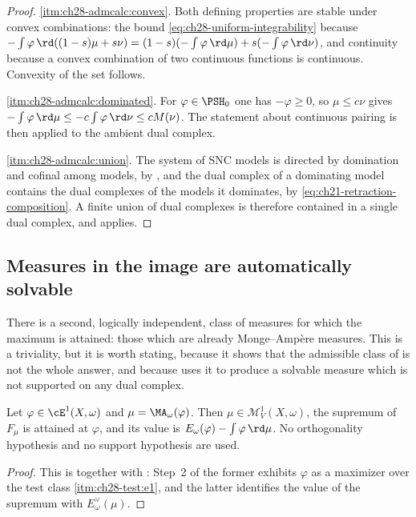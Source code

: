 \begin{proof}
\cref{itm:ch28-admcalc:convex}.  Both defining properties are stable under
convex combinations: the bound \eqref{eq:ch28-uniform-integrability} because
\(-\int\varphi\,\rd((1-s)\mu+s\nu)=(1-s)(-\int\varphi\,\rd\mu)
+s(-\int\varphi\,\rd\nu)\), and continuity because a convex combination of
two continuous functions is continuous.  Convexity of the set follows.

\cref{itm:ch28-admcalc:dominated}.  For \(\varphi\in\PSH_0\) one has
\(-\varphi\geq0\), so \(\mu\leq c\nu\) gives
\(-\int\varphi\,\rd\mu\leq-c\int\varphi\,\rd\nu\leq cM(\nu)\).  The
statement about continuous pairing is then
 applied to the ambient dual complex.

\cref{itm:ch28-admcalc:union}.  The system of SNC models is directed by
domination and cofinal among models, by , and the
dual complex of a dominating model contains the dual complexes of the models
it dominates, by \eqref{eq:ch21-retraction-composition}.  A finite union of
dual complexes is therefore contained in a single dual complex, and
 applies.
\end{proof}

\subsection{Measures in the image are automatically solvable}
\label{sec:ch28-image-solvable}

There is a second, logically independent, class of measures for which the
maximum is attained: those which are already Monge--Amp\`ere measures.  This
is a triviality, but it is worth stating, because it shows that the
admissible class of  is not the whole
answer, and because  uses it to produce
a solvable measure which is not supported on any dual complex.

\begin{proposition}
\label{prop:ch28-image-is-solvable}
Let \(\varphi\in\cE^1(X,\omega)\) and \(\mu=\MA_\omega(\varphi)\).  Then
\(\mu\in\mathcal M^1_V(X,\omega)\), the supremum of \(F_\mu\) is attained at
\(\varphi\), and its value is
\(E_\omega(\varphi)-\int\varphi\,\rd\mu\).  No orthogonality hypothesis and
no support hypothesis are used.
\end{proposition}

\begin{proof}
This is  together with
: Step~2 of the former exhibits
\(\varphi\) as a maximizer over the test class
\cref{itm:ch28-test:e1}, and the latter identifies the value of the supremum
with \(E^\vee_\omega(\mu)\).
\end{proof}

